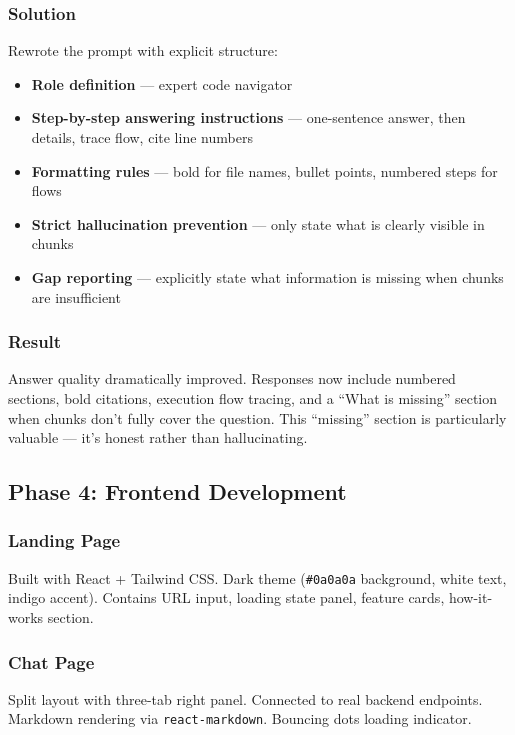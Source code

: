 \documentclass[a4paper,11pt]{article}
\begin{document}
\subsubsection{Solution}
Rewrote the prompt with explicit structure:
\begin{itemize}
    \item \textbf{Role definition} --- expert code navigator
    \item \textbf{Step-by-step answering instructions} --- one-sentence answer, then details, trace flow, cite line numbers
    \item \textbf{Formatting rules} --- bold for file names, bullet points, numbered steps for flows
    \item \textbf{Strict hallucination prevention} --- only state what is clearly visible in chunks
    \item \textbf{Gap reporting} --- explicitly state what information is missing when chunks are insufficient
\end{itemize}

\subsubsection{Result}
Answer quality dramatically improved. Responses now include numbered sections, bold citations, execution flow tracing, and a ``What is missing'' section when chunks don't fully cover the question. This ``missing'' section is particularly valuable --- it's honest rather than hallucinating.

\subsection{Phase 4: Frontend Development}

\subsubsection{Landing Page}
Built with React + Tailwind CSS. Dark theme (\texttt{\#0a0a0a} background, white text, indigo accent). Contains URL input, loading state panel, feature cards, how-it-works section.

\subsubsection{Chat Page}
Split layout with three-tab right panel. Connected to real backend endpoints. Markdown rendering via \texttt{react-markdown}. Bouncing dots loading indicator.
\end{document}
